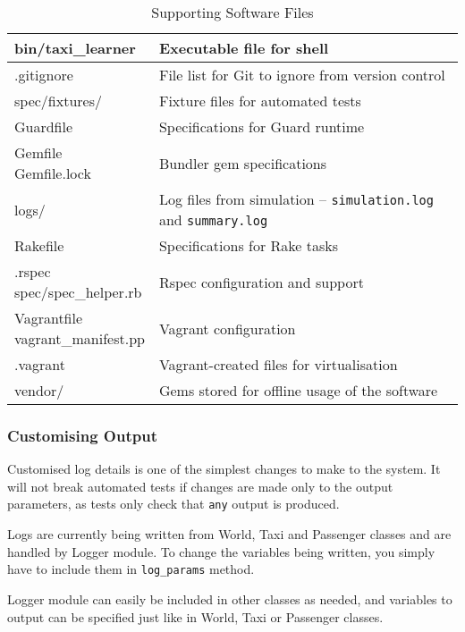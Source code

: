 \begin{table}
\begin{tabular}{| p{} | p{} |}
  \hline
  bin/taxi\_learner & Executable file for shell \\ \hline
  .gitignore & File list for Git to ignore from version control \\ \hline
  spec/fixtures/ & Fixture files for automated tests \\ \hline
  Guardfile & Specifications for Guard runtime \\ \hline
  \specialcell{Gemfile \\ Gemfile.lock} & Bundler gem specifications \\ \hline
  logs/ & Log files from simulation -- \texttt{simulation.log} and \texttt{summary.log} \\ \hline
  Rakefile & Specifications for Rake tasks \\ \hline
  \specialcell{.rspec \\ spec/spec\_helper.rb}  & Rspec configuration and support \\ \hline
  \specialcell{Vagrantfile \\ vagrant\_manifest.pp} & Vagrant configuration \\ \hline
  .vagrant & Vagrant-created files for virtualisation \\ \hline
  vendor/ & Gems stored for offline usage of the software \\ \hline
\end{tabular}
\caption{
  Supporting Software Files
  \label{table:software:support}
}
\end{table}


\subsubsection{Customising Output}
\label{sec:maintenance_manual:customising_output}

Customised log details is one of the simplest changes to make to the system. It
will not break automated tests if changes are made only to the output
parameters, as tests only check that \texttt{any} output is produced.

Logs are currently being written from World, Taxi and Passenger classes and are
handled by Logger module. To change the variables being written, you simply
have to include them in \texttt{log\_params} method.

Logger module can easily be included in other classes as needed, and variables
to output can be specified just like in World, Taxi or Passenger classes.


